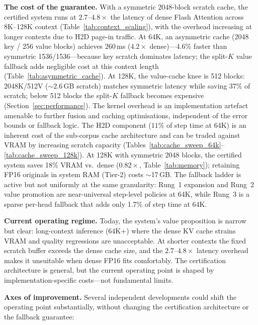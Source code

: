 \documentclass[10pt,twocolumn,a4paper]{article}
\theoremstyle{definition}
\theoremstyle{remark}
\begin{document}
\textbf{The cost of the guarantee.}  With a symmetric 2048-block scratch cache, the certified system runs at $2.7\text{--}4.8\times$ the latency of dense Flash Attention across 8K--128K context (Table~\ref{tab:context_scaling}), with the overhead increasing at longer contexts due to H2D page-in traffic.  At 64K, an asymmetric cache (2048 key / 256 value blocks) achieves 260\,ms ($4.2\times$ dense)---4.6\% faster than symmetric 1536/1536---because key scratch dominates latency; the split-$K$ value fallback adds negligible cost at this context length (Table~\ref{tab:asymmetric_cache}).  At 128K, the value-cache knee is 512 blocks: 2048K/512V (${\sim}2.6$\,GB scratch) matches symmetric latency while saving 37\% of scratch; below 512 blocks the split-$K$ fallback becomes expensive (Section~\ref{sec:performance}).  The kernel overhead is an implementation artefact amenable to further fusion and caching optimisations, independent of the error bounds or fallback logic.  The H2D component ($11\%$ of step time at 64K) is an inherent cost of the sub-corpus cache architecture and can be traded against VRAM by increasing scratch capacity (Tables~\ref{tab:cache_sweep_64k}--\ref{tab:cache_sweep_128k}).  At 128K with symmetric 2048 blocks, the certified system saves 18\% VRAM vs.\ dense ($0.82\times$, Table~\ref{tab:memory}); retaining FP16 originals in system RAM (Tier-2) costs $\sim$17\,GB.  The fallback ladder is active but not uniformly at the same granularity: Rung~1 expansion and Rung~2 value promotion are near-universal step-level policies at 64K, while Rung~3 is a sparse per-head fallback that adds only 1.7\% of step time at 64K.

\textbf{Current operating regime.}  Today, the system's value proposition is narrow but clear: long-context inference (64K+) where the dense KV cache strains VRAM and quality regressions are unacceptable.  At shorter contexts the fixed scratch buffer exceeds the dense cache size, and the $2.7\text{--}4.8\times$ latency overhead makes it unsuitable when dense FP16 fits comfortably.  The certification architecture is general, but the current operating point is shaped by implementation-specific costs---not fundamental limits.

\textbf{Axes of improvement.}  Several independent developments could shift the operating point substantially, without changing the certification architecture or the fallback guarantee:
\end{document}
